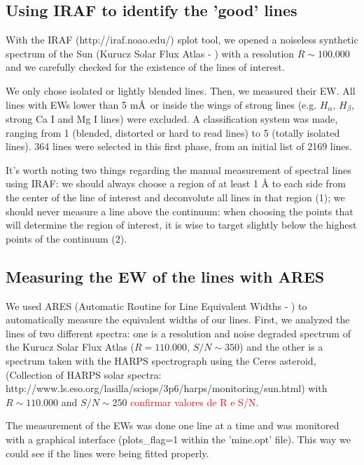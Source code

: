 \documentclass[dvips,12pt,a4paper]{report}
\begin{document}
{\subsection {Using IRAF to identify the 'good' lines}

With the IRAF (http://iraf.noao.edu/) splot tool, we opened a noiseless synthetic spectrum of the Sun (Kurucz Solar Flux Atlas - \citet{Kurucz-1984} ) with a resolution $R\sim100.000$ and we carefully checked for the existence of the lines of interest.

We only chose isolated or lightly blended lines. Then, we measured their EW. All lines with EWs lower than 5 m\AA\, or inside the wings of strong lines (e.g. $H_\alpha$, $H_\beta$, strong Ca I and Mg I lines) were excluded. A classification system was made, ranging from 1 (blended, distorted or hard to read lines) to 5 (totally isolated lines). 364 lines were selected in this first phase, from an initial list of 2169 lines. 

It's worth noting two things regarding the manual measurement of spectral lines using IRAF: we should always choose a region of at least 1 \AA{} to each side from the center of the line of interest and deconvolute all lines in that region (1); we should never measure a line above the continuum: when choosing the points that will determine the region of interest, it is wise to target slightly below the highest points of the continuum (2).

\subsection {Measuring the EW of the lines with ARES}
\label{ARES}
We used ARES (Automatic Routine for Line Equivalent Widths - \citep{Sousa-2007}) to automatically measure the equivalent widths of our lines. First, we analyzed the lines of two different spectra: one is a resolution and noise degraded spectrum of the Kurucz Solar Flux Atlas ($R=110.000$, $S/N\sim350$) and the other is a spectrum taken with the HARPS spectrograph using the Ceres asteroid, (Collection of HARPS solar spectra: http://www.ls.eso.org/lasilla/sciops/3p6/harps/monitoring/sun.html) with $R\sim110.000$ and $S/N\sim250$ \textcolor{red}{confirmar valores de R e S/N}.

The measurement of the EWs was done one line at a time and was monitored with a graphical interface (plots\_flag=1 within the 'mine.opt' file). This way we could see if the lines were being fitted properly. 

}
\end{document}
